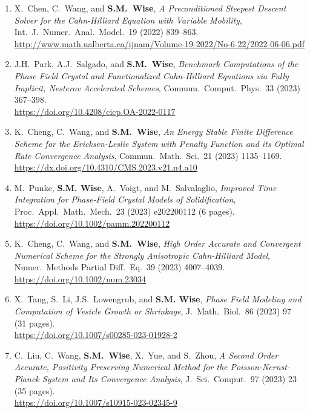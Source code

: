\documentclass[11pt]{letter}
\begin{document}
\begin{enumerate}
	\item
X.~Chen, C.~Wang, and \textbf{S.M.~Wise}, {\sl A Preconditioned Steepest Descent Solver for the Cahn-Hilliard Equation with Variable Mobility}, Int.~J.~Numer.~Anal.~Model.~19 (2022) 839--863.
	\\
\url{http://www.math.ualberta.ca/ijnam/Volume-19-2022/No-6-22/2022-06-06.pdf}

	\item
J.H.~Park, A.J.~Salgado, and \textbf{S.M.~Wise}, {\sl Benchmark Computations of the Phase Field Crystal and Functionalized Cahn-Hilliard Equations via Fully Implicit, Nesterov Accelerated Schemes}, Commun.~Comput.~Phys.~33 (2023) 367--398.
	\\
\url{https://doi.org/10.4208/cicp.OA-2022-0117}

	\item
K.~Cheng, C.~Wang, and \textbf{S.M.~Wise}, {\sl An Energy Stable Finite Difference Scheme for the Ericksen-Leslie System with Penalty Function and its Optimal Rate Convergence Analysis}, Commun.~Math.~Sci.~21 (2023)  1135--1169.
	\\
\url{https://dx.doi.org/10.4310/CMS.2023.v21.n4.a10}

	\item
M.~Punke, \textbf{S.M. Wise}, A.~Voigt, and M.~Salvalaglio, {\sl Improved Time Integration for Phase-Field Crystal Models of Solidification}, Proc.~Appl.~Math.~Mech.~23 (2023) e202200112 (6 pages).
	\\
\url{https://doi.org/10.1002/pamm.202200112}

	\item
K.~Cheng, C.~Wang, and \textbf{S.M.~Wise}, {\sl High Order Accurate and Convergent Numerical Scheme for the Strongly Anisotropic Cahn-Hilliard Model}, Numer.~Methods Partial Diff.~Eq.~39 (2023) 4007--4039.
	\\
\url{https://doi.org/10.1002/num.23034}

	\item
X.~Tang, S.~Li, J.S.~Lowengrub, and \textbf{S.M. Wise}, {\sl Phase Field Modeling and Computation of Vesicle Growth or Shrinkage}, J.~Math.~Biol.~86 (2023) 97 (31 pages).
	\\
\url{https://doi.org/10.1007/s00285-023-01928-2}

	\item
C.~Liu, C.~Wang, \textbf{S.M.~Wise}, X.~Yue, and S.~Zhou, {\sl A Second Order Accurate, Positivity Preserving Numerical Method for the Poisson-Nernst-Planck System and Its Convergence Analysis}, J.~Sci.~Comput.~97 (2023) 23 (35 pages).
	\\
\url{https://doi.org/10.1007/s10915-023-02345-9}	


\end{enumerate}
\end{document}
